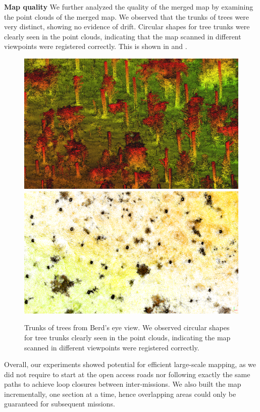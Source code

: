 \newline
\newline
\textbf{Map quality}\hspace{0.5em} We further analyzed the quality of the merged map by examining the point clouds of the merged map. We observed that the trunks of trees were very distinct, showing no evidence of drift. Circular shapes for tree trunks were clearly seen in the point clouds, indicating that the map scanned in different viewpoints were registered correctly. This is shown in  and .
\begin{figure}[htbp]
  \centering
  \includegraphics[width=0.49\columnwidth]{pics/exp_3_offline_pointclouds_trunk.png}
  \includegraphics[width=0.49\columnwidth]{pics/exp_3_offline_pointclouds_trunk_BV3.png}
  \caption{Trunks of trees from Berd's eye view. We observed circular shapes for tree trunks clearly seen in the point clouds, indicating the map scanned in different viewpoints were registered correctly.}
  \label{fig:truk of trees}
\end{figure}
Overall, our experiments showed potential for efficient large-scale mapping, as we did not require to start at the open access roads nor following exactly the same paths to achieve loop closures between inter-missions. We also built the map incrementally, one section at a time, hence overlapping areas could only be guaranteed for subsequent missions.





